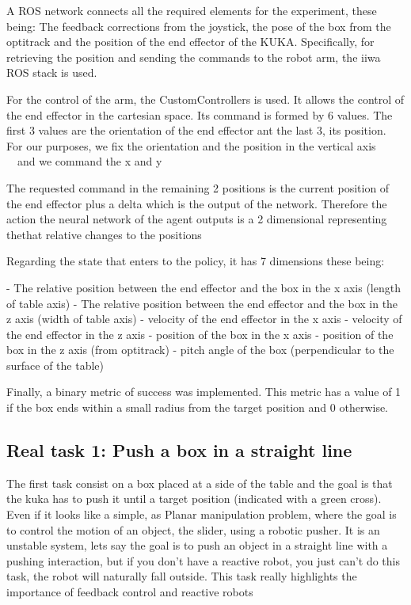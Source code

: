 A ROS network connects all the required elements for the experiment, these being: The feedback corrections from the joystick, the pose of the box from the optitrack and the position of the end effector of the KUKA. Specifically, for retrieving the position and sending the commands to the robot arm, the iiwa ROS stack \cite{iiwa} is used. 

For the control of the arm, the CustomControllers is used. It allows the control of the end effector in the cartesian space. Its command is formed by 6 values. The first 3 values are the orientation of the end effector ant the last 3, its position. For our purposes, we fix the orientation and the position in the vertical axis ~~and we command the x and y~~

The requested command in the remaining 2 positions is the current position of the end effector plus a delta which is the output of the network. Therefore the action the neural network of the agent outputs is a 2 dimensional representing thethat relative changes to the positions 

Regarding the state that enters to the policy, it has 7 dimensions these being:

- The relative position between the end effector and the box in the x axis (length of table axis)
- The relative position between the end effector and the box in the z axis (width of table axis)
- velocity of the end effector in the x axis
- velocity of the end effector in the z axis
- position of the box in the x axis
- position of the box in the z axis (from optitrack)
- pitch angle of the box (perpendicular to the surface of the table)

Finally, a binary metric of success was implemented. This metric has a value of 1 if the box ends within a small radius from the target position and 0 otherwise.

\subsection{Real task 1: Push a box in a straight line}

\label{subsection:Push box in a straight line}

The first task consist on a box placed at a side of the table and the goal is that the kuka has to push it until a target position (indicated with a green cross). Even if it looks like a simple, as \cite{constant_velocity} Planar manipulation problem, where the goal is to control the motion of an object, the slider, using a robotic pusher. It is an unstable system, lets say the goal is to push an object in a straight line with a pushing interaction, but if you don't have a reactive robot, you just can't do this task, the robot will naturally fall outside. This task really highlights the importance of feedback control and reactive robots

